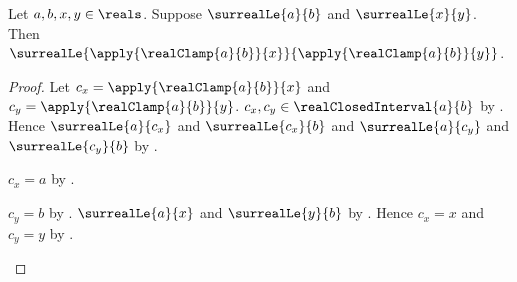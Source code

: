 \begin{theorem}\label{real_clamp_nondecreasing}
    Let $a,b,x,y\in\reals$.
    Suppose $\surrealLe{a}{b}$ and $\surrealLe{x}{y}$.
    Then
        $\surrealLe{\apply{\realClamp{a}{b}}{x}}
            {\apply{\realClamp{a}{b}}{y}}$.
\end{theorem}
\begin{proof}
    Let $c_x=\apply{\realClamp{a}{b}}{x}$ and
        $c_y=\apply{\realClamp{a}{b}}{y}$.
    $c_x,c_y\in\realClosedInterval{a}{b}$
        by .
    Hence $\surrealLe{a}{c_x}$ and $\surrealLe{c_x}{b}$ and
        $\surrealLe{a}{c_y}$ and $\surrealLe{c_y}{b}$
        by .
    \begin{byCase}
        $c_x=a$ by
            .
        \begin{byCase}
            $c_y=b$ by
                .
            $\surrealLe{a}{x}$ and $\surrealLe{y}{b}$
                by
                .
            Hence $c_x=x$ and $c_y=y$
                by
                .
        \end{byCase}
    \end{byCase}
\end{proof}

